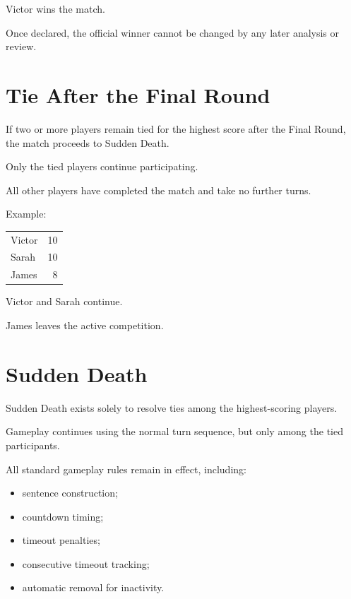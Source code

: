 \documentclass[11pt,a4paper]{article}
\begin{document}
Victor wins the match.

Once declared, the official winner cannot be changed by any later analysis or review.

\section{Tie After the Final Round}

If two or more players remain tied for the highest score after the Final Round, the match proceeds to Sudden Death.

Only the tied players continue participating.

All other players have completed the match and take no further turns.

Example:

\begin{center}
\begin{tabular}{lr}
\toprule
Victor & 10 \\
Sarah & 10 \\
James & 8 \\
\bottomrule
\end{tabular}
\end{center}

Victor and Sarah continue.

James leaves the active competition.

\section{Sudden Death}

Sudden Death exists solely to resolve ties among the highest-scoring players.

Gameplay continues using the normal turn sequence, but only among the tied participants.

All standard gameplay rules remain in effect, including:

\begin{itemize}
    \item sentence construction;
    \item countdown timing;
    \item timeout penalties;
    \item consecutive timeout tracking;
    \item automatic removal for inactivity.
\end{itemize}
\end{document}
